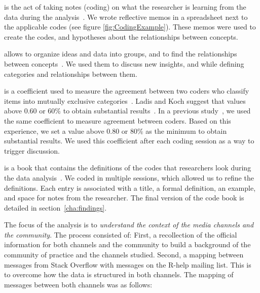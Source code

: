 	\begin{description}[itemsep=2pt, topsep=0pt, leftmargin=0em, parsep=0pt]
		\item[Memoing] is the act of taking notes (coding) on what the researcher is learning from the data during the analysis~\cite{Groenewald2008}.
        We wrote reflective memos in a spreadsheet next to the applicable codes (see figure \ref{fig:CodingExample}).
        These memos were used to create the codes, and hypotheses about the relationships between concepts.

		\item[Affinity diagrams] allows to organize ideas and data into groups, and to find the relationships between concepts~\cite{Scupin1997}.
		We used them to discuss new insights, and while defining categories and relationships between them.

		\item[Inter-rater agreement \textit{Cohen Kappa}] is a coefficient used to measure the agreement between two coders who classify items into mutually exclusive categories~\cite{Stemler2004}.
		Ladis and Koch suggest that values above 0.60 or 60\% to obtain substantial results~\cite{Landis1977}.
		In a previous study~\cite{Gomez2013}, we used the same coefficient to measure agreement between coders.
		Based on this experience, we set a value above 0.80 or 80\% as the minimum to obtain substantial results.
		We used this coefficient after each coding session as a way to trigger discussion.

		\item[Code book] is a book that contains the definitions of the codes that researchers look during the data analysis~\cite{MacQueen1998}.
		We coded in multiple sessions, which allowed us to refine the definitions.
		Each entry is associated with a title, a formal definition, an example, and space for notes from the researcher.
		The final version of the code book is detailed in section~\ref{cha:findings}.
	\end{description}

	The focus of the analysis is to \textit{understand the context of the media channels and the community}.
	The process consisted of:
	First, a recollection of the official information for both channels and the community to build a background of the community of practice and the channels studied.
	Second, a mapping between messages from Stack Overflow with messages on the R-help mailing list.
    This is to overcome how the data is structured in both channels.
    The mapping of messages between both channels was as follows:


